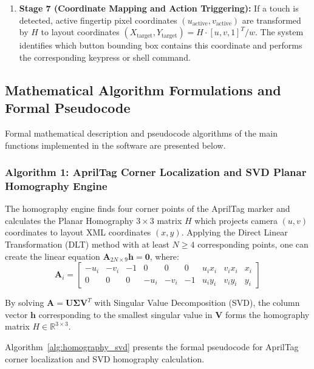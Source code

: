 \begin{enumerate}
    \item \textbf{Stage 7 (Coordinate Mapping and Action Triggering):} If a touch is detected, active fingertip pixel coordinates $(u_{\text{active}}, v_{\text{active}})$ are transformed by $H$ to layout coordinates $(X_{\text{target}}, Y_{\text{target}}) = H \cdot [u, v, 1]^T / w$. The system identifies which button bounding box contains this coordinate and performs the corresponding keypress or shell command.
\end{enumerate}

\subsection{Mathematical Algorithm Formulations and Formal Pseudocode}
\label{subsec:imp_pseudocode_algorithms}
Formal mathematical description and pseudocode algorithms of the main functions implemented in the software are presented below.

\subsubsection{Algorithm 1: AprilTag Corner Localization and SVD Planar Homography Engine}
The homography engine finds four corner points of the AprilTag marker and calculates the Planar Homography $3 \times 3$ matrix $H$ which projects camera $(u, v)$ coordinates to layout XML coordinates $(x, y)$. Applying the Direct Linear Transformation (DLT) method with at least $N \ge 4$ corresponding points, one can create the linear equation $\mathbf{A}_{2N \times 9} \mathbf{h} = \mathbf{0}$, where:
\begin{equation}
\mathbf{A}_i = \begin{bmatrix}
-u_i & -v_i & -1 & 0 & 0 & 0 & u_i x_i & v_i x_i & x_i \\
0 & 0 & 0 & -u_i & -v_i & -1 & u_i y_i & v_i y_i & y_i
\end{bmatrix}
\label{eq:dlt_matrix_app}
\end{equation}

By solving $\mathbf{A} = \mathbf{U} \mathbf{\Sigma} \mathbf{V}^T$ with Singular Value Decomposition (SVD), the column vector $\mathbf{h}$ corresponding to the smallest singular value in $\mathbf{V}$ forms the homography matrix $H \in \mathbb{R}^{3 \times 3}$.

Algorithm~\ref{alg:homography_svd} presents the formal pseudocode for AprilTag corner localization and SVD homography calculation.

